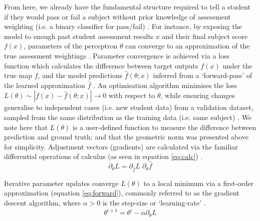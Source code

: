 From here, we already have the fundamental structure required to tell a student if they would pass or fail a subject without prior knowledge of assessment weighting
(i.e. a binary classifier for pass/fail) \cite{rosenblatt1957}. For instance, by exposing the model to enough past student assessment results $x$ and their final subject score $f(x)$, parameters of the perceptron $\theta$ can converge to an approximation of the true assessment weightings \cite{Lundervold2019}. Parameter convergence is achieved via a loss function which calculates the difference between target outputs $f(x)$ under the true map $f$, and the model predictions $\hat{f}(\theta; x)$ inferred from a `forward-pass' of the learned approximation $\hat{f}$ \cite{Bertels2019}. An optimisation algorithm minimises the loss $L(\theta) \sim |f(x)-\hat{f}(\theta; x)| \to 0$ with respect to $\theta$, while ensuring changes generalise to independent cases (i.e. new student data) from a validation dataset, sampled from the same distribution as the training data (i.e. same subject) \cite{Maier2019}. We note here that $L(\theta)$ is a user-defined function to measure the difference between prediction and ground truth; and that the geometric norm was presented above for simplicity. Adjustment vectors (gradients) are calculated via the familiar differential operations of calculus (as seen in equation \ref{eq:calc}) \cite{Maier2019}.
\begin{equation}
\partial_{\theta} L = \partial_{\hat{f}}  L \; \partial_{\theta} \hat{f}
\label{eq:calc}
\end{equation}

Iterative parameter updates converge $L(\theta)$ to a local minimum via a first-order approximation (equation \ref{eq:forward}), commonly referred to as the gradient descent algorithm, where $\alpha>0$ is the step-size or `learning-rate' \cite{Maier2019}.
\begin{equation}
\theta^{i+1} = \theta^{i} - \alpha \partial_{\theta} L 
\label{eq:forward}
\end{equation}

